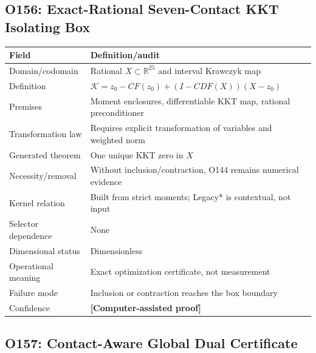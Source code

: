 \documentclass[11pt,a4paper]{article}
\newcommand{\status}[1]{\textbf{[#1]}}
\begin{document}
\subsection{O156: Exact-Rational Seven-Contact KKT Isolating Box}

\begin{longtable}{p{}p{}}
\toprule
Field & Definition/audit\\\midrule
Domain/codomain & Rational $X\subset\mathbb R^{25}$ and interval Krawczyk map\\
Definition & $\mathcal K=z_0-CF(z_0)+(I-CDF(X))(X-z_0)$\\
Premises & Moment enclosures, differentiable KKT map, rational preconditioner\\
Transformation law & Requires explicit transformation of variables and weighted norm\\
Generated theorem & One unique KKT zero in $X$\\
Necessity/removal & Without inclusion/contraction, O144 remains numerical evidence\\
Kernel relation & Built from strict moments; Legacy* is contextual, not input\\
Selector dependence & None\\
Dimensional status & Dimensionless\\
Operational meaning & Exact optimization certificate, not measurement\\
Failure mode & Inclusion or contraction reaches the box boundary\\
Confidence & \status{Computer-assisted proof}\\
\bottomrule
\end{longtable}

\subsection{O157: Contact-Aware Global Dual Certificate}
\end{document}
